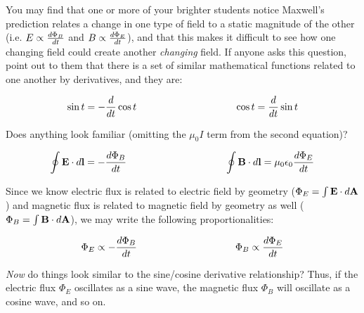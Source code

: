 You may find that one or more of your brighter students notice Maxwell's prediction relates a change in one type of field to a static magnitude of the other (i.e. $E \propto {d\Phi_B \over dt}$ and $B \propto {d\Phi_E \over dt}$), and that this makes it difficult to see how one changing field could create another {\it changing} field.  If anyone asks this question, point out to them that there is a set of similar mathematical functions related to one another by derivatives, and they are:

$$\sin t = - {d \over dt} \cos t  \hbox{\hskip 100pt}  \cos t = {d \over dt} \sin t$$

\vskip 10pt

Does anything look familiar (omitting the $\mu_0 I$ term from the second equation)?

\vskip 10pt

$$\oint {\bf E} \cdot d{\bf l} = - {d \Phi_B \over dt}  \hbox{\hskip 100pt}  \oint {\bf B} \cdot d{\bf l} =  \mu_0 \epsilon_0 {d \Phi_E \over dt}$$

Since we know electric flux is related to electric field by geometry ($\Phi_E = \int {\bf E} \cdot d{\bf A}$) and magnetic flux is related to magnetic field by geometry as well ($\Phi_B = \int {\bf B} \cdot d{\bf A}$), we may write the following proportionalities:

$$\Phi_E \propto - {d \Phi_B \over dt}  \hbox{\hskip 100pt}  \Phi_B \propto {d \Phi_E \over dt}$$

{\it Now} do things look similar to the sine/cosine derivative relationship?  Thus, if the electric flux $\Phi_E$ oscillates as a sine wave, the magnetic flux $\Phi_B$ will oscillate as a cosine wave, and so on.




